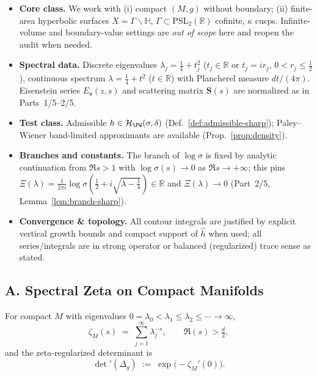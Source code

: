 \begin{tcolorbox}[colback=gray!5,colframe=gray!35,
  title=Scope \& Assumptions (ZNB-9+++ • enforced)]
\begin{itemize}
  \item \textbf{Core class.} We work with (i) compact $(M,g)$ without boundary; (ii) finite-area hyperbolic surfaces $X=\Gamma\backslash\mathbb H$, $\Gamma\subset\mathrm{PSL}_2(\mathbb R)$ cofinite, $\kappa$ cusps. Infinite-volume and boundary-value settings are \emph{out of scope} here and reopen the audit when needed.
  \item \textbf{Spectral data.} Discrete eigenvalues $\lambda_j=\tfrac14+t_j^2$ ($t_j\in\mathbb R$ or $t_j=ir_j$, $0<r_j\le \tfrac12$), continuous spectrum $\lambda=\tfrac14+t^2$ ($t\in\mathbb R$) with Plancherel measure $dt/(4\pi)$. Eisenstein series $E_{\mathfrak a}(z,s)$ and scattering matrix $\mathbf S(s)$ are normalized as in Parts~1/5–2/5.
  \item \textbf{Test class.} Admissible $h\in\mathcal H_{\PW}(\sigma,\delta)$ (Def.~\ref{def:admissible-sharp}); Paley–Wiener band-limited approximants are available (Prop.~\ref{prop:density}).
  \item \textbf{Branches and constants.} The branch of $\log\sigma$ is fixed by analytic continuation from $\Re s>1$ with $\log\sigma(s)\to 0$ as $\Re s\to+\infty$; this pins $\Xi(\lambda)=\frac{1}{2\pi i}\log\sigma(\tfrac12+i\sqrt{\lambda-\tfrac14})\in\mathbb R$ and $\Xi(\lambda)\to 0$ (Part~2/5, Lemma~\ref{lem:branch-sharp}).
  \item \textbf{Convergence \& topology.} All contour integrals are justified by explicit vertical growth bounds and compact support of $\hat h$ when used; all series/integrals are in strong operator or balanced (regularized) trace sense as stated.
\end{itemize}
\end{tcolorbox}

\subsection*{A. Spectral Zeta on Compact Manifolds}
\label{subsec:spectral-zeta-compact-expanded}

\begin{definition}
\label{def:zeta-compact}
For compact $M$ with eigenvalues $0=\lambda_0<\lambda_1\le \lambda_2\le\cdots\to\infty$,
\[
   \zeta_M(s)\;=\;\sum_{j=1}^{\infty}\lambda_j^{-s},\qquad \Re(s)>\tfrac d2,
\]
and the zeta-regularized determinant is
\[
   \det{}'(\Delta_g)\;:=\;\exp\!\big(-\zeta_M'(0)\big).
\]
\end{definition}

